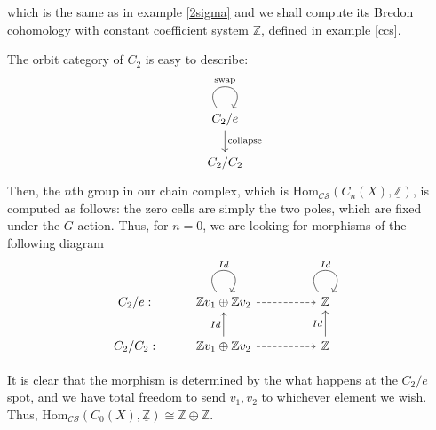 \documentclass{article}
\theoremstyle{definition}
\begin{document}
which is the same as in example \ref{2sigma} and we shall compute its Bredon cohomology with constant coefficient system $\underline{\mathbb{Z}}$, defined in example \ref{ccs}.

The orbit category of $C_2$ is easy to describe:
\[\begin{tikzcd}
	{C_2/e} \\
	{C_2/C_2}
	\arrow["{\textrm{swap}}", from=1-1, to=1-1, loop, in=55, out=125, distance=10mm]
	\arrow["{\textrm{collapse}}", from=1-1, to=2-1]
\end{tikzcd}\]
Then, the $n$th group in our chain complex, which is $\textrm{Hom}_{\mathcal{CS}}(C_n(X),\underline{\mathbb{Z}})$, is computed as follows: the zero cells are simply the two poles, which are fixed under the $G$-action. Thus, for $n=0$, we are looking for morphisms of the following diagram 
\[\begin{tikzcd}
	{C_2/e:} & {\mathbb{Z}v_1\oplus\mathbb{Z}v_2} && {\mathbb{Z}} \\
	{C_2/C_2:} & {\mathbb{Z}v_1\oplus\mathbb{Z}v_2} && {\mathbb{Z}}
	\arrow["Id", from=1-2, to=1-2, loop, in=55, out=125, distance=10mm]
	\arrow[dashed, from=1-2, to=1-4]
	\arrow["Id", from=1-4, to=1-4, loop, in=55, out=125, distance=10mm]
	\arrow["Id", from=2-2, to=1-2]
	\arrow[dashed, from=2-2, to=2-4]
	\arrow["Id", from=2-4, to=1-4]
\end{tikzcd}\]

It is clear that the morphism is determined by the what happens at the $C_2/e$ spot, and we have total freedom to send $v_1,v_2$ to whichever element we wish. Thus, $\textrm{Hom}_{\mathcal{CS}}(C_0(X),\underline{\mathbb{Z}})\cong \mathbb{Z}\oplus \mathbb{Z}$. 
\end{document}
